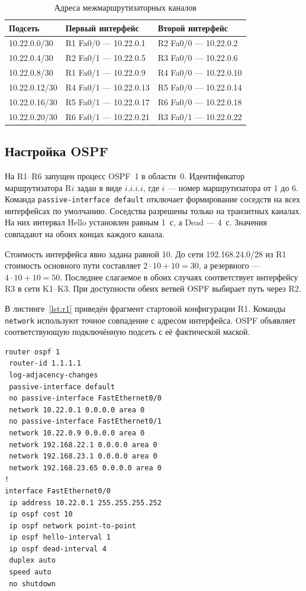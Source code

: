 \documentclass[a4paper,14pt]{extarticle}
\begin{document}
\begin{table}[htbp]
  \centering\small
  \caption{Адреса межмаршрутизаторных каналов}
  \label{tab:transit}
  \begin{tabularx}{\linewidth}{@{}lXX@{}}
    \toprule
    Подсеть & Первый интерфейс & Второй интерфейс \\
    \midrule
    10.22.0.0/30  & R1 Fa0/0 --- 10.22.0.1  & R2 Fa0/0 --- 10.22.0.2 \\
    10.22.0.4/30  & R2 Fa0/1 --- 10.22.0.5  & R3 Fa0/0 --- 10.22.0.6 \\
    10.22.0.8/30  & R1 Fa0/1 --- 10.22.0.9  & R4 Fa0/0 --- 10.22.0.10 \\
    10.22.0.12/30 & R4 Fa0/1 --- 10.22.0.13 & R5 Fa0/0 --- 10.22.0.14 \\
    10.22.0.16/30 & R5 Fa0/1 --- 10.22.0.17 & R6 Fa0/0 --- 10.22.0.18 \\
    10.22.0.20/30 & R6 Fa0/1 --- 10.22.0.21 & R3 Fa0/1 --- 10.22.0.22 \\
    \bottomrule
  \end{tabularx}
\end{table}

\clearpage
\subsection{Настройка OSPF}

На R1--R6 запущен процесс OSPF~1 в области~0. Идентификатор
маршрутизатора R\(i\) задан в виде \(i.i.i.i\), где \(i\) --- номер
маршрутизатора от 1 до 6. Команда \texttt{passive-interface default}
отключает формирование соседств на всех интерфейсах по умолчанию.
Соседства разрешены только на транзитных каналах. На них интервал
Hello установлен равным 1~с, а Dead --- 4~с. Значения совпадают на обоих
концах каждого канала.

Стоимость интерфейса явно задана равной 10. До сети 192.168.24.0/28
из R1 стоимость основного пути составляет \(2\cdot10+10=30\), а
резервного --- \(4\cdot10+10=50\). Последнее слагаемое в обоих
случаях соответствует интерфейсу R3 в сети K1--K3. При доступности
обеих ветвей OSPF выбирает путь через R2.

В листинге~\ref{lst:r1} приведён фрагмент стартовой конфигурации R1.
Команды \texttt{network} используют точное совпадение с адресом
интерфейса. OSPF объявляет соответствующую подключённую подсеть с
её фактической маской.

{\singlespacing
\begin{lstlisting}[caption={Фрагмент конфигурации OSPF на R1},label={lst:r1}]
router ospf 1
 router-id 1.1.1.1
 log-adjacency-changes
 passive-interface default
 no passive-interface FastEthernet0/0
 network 10.22.0.1 0.0.0.0 area 0
 no passive-interface FastEthernet0/1
 network 10.22.0.9 0.0.0.0 area 0
 network 192.168.22.1 0.0.0.0 area 0
 network 192.168.23.1 0.0.0.0 area 0
 network 192.168.23.65 0.0.0.0 area 0
!
interface FastEthernet0/0
 ip address 10.22.0.1 255.255.255.252
 ip ospf cost 10
 ip ospf network point-to-point
 ip ospf hello-interval 1
 ip ospf dead-interval 4
 duplex auto
 speed auto
 no shutdown
\end{lstlisting}
}
\end{document}
